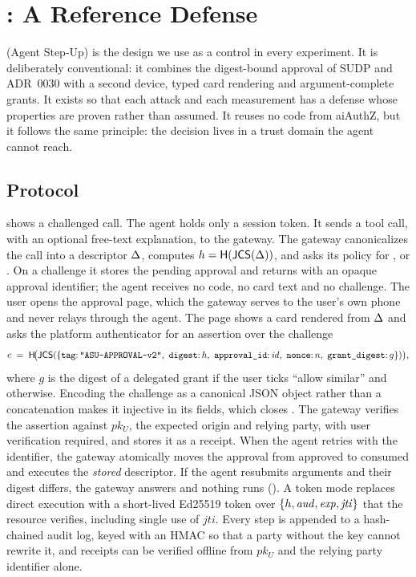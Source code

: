 \section{\sys{}: A Reference Defense}\label{sec:design}

\sys{} (Agent Step-Up) is the design we use as a control in every experiment. It is deliberately conventional:
it combines the digest-bound approval of SUDP and ADR~0030 with a second device, typed card rendering and
argument-complete grants. It exists so that each attack and each measurement has a defense whose properties are
proven rather than assumed. It reuses no code from aiAuthZ, but it follows the same principle: the decision
lives in a trust domain the agent cannot reach.

\subsection{Protocol}

 shows a challenged call. The agent holds only a session token. It sends a tool call, with an
optional free-text explanation, to the gateway. The gateway canonicalizes the call into a descriptor $\Delta$,
computes $h=\mathsf{H}(\mathsf{JCS}(\Delta))$, and asks its policy for ,  or . On a
challenge it stores the pending approval and returns  with an opaque approval identifier; the agent
receives no code, no card text and no challenge. The user opens the approval page, which the gateway serves to
the user's own phone and never relays through the agent. The page shows a card rendered from $\Delta$ and asks the
platform authenticator for an assertion over the challenge
\[
c \;=\; \Hash\!\big(\JCS(\{\texttt{tag}{:}\,\texttt{"ASU-APPROVAL-v2"},\ \texttt{digest}{:}\,\dig,\
\texttt{approval\_id}{:}\,\mathit{id},\ \texttt{nonce}{:}\,n,\ \texttt{grant\_digest}{:}\,g\})\big),
\]
where $g$ is the digest of a delegated grant if the user ticks ``allow similar'' and  otherwise.
Encoding the challenge as a canonical JSON object rather than a concatenation makes it injective in its fields,
which closes \AB{8}. The gateway verifies the assertion against $pk_U$, the expected origin and relying party,
with user verification required, and stores it as a receipt. When the agent retries with the identifier, the
gateway atomically moves the approval from approved to consumed and executes the \emph{stored} descriptor. If the
agent resubmits arguments and their digest differs, the gateway answers \code{409 effect\_mismatch} and nothing
runs (\AB{10}). A token mode replaces direct execution with a short-lived Ed25519 token over
$\{h,\mathit{aud},\mathit{exp},\mathit{jti}\}$ that the resource verifies, including single use of
$\mathit{jti}$. Every step is appended to a hash-chained audit log, keyed with an HMAC so that a party without the
key cannot rewrite it, and receipts can be verified offline from $pk_U$ and the relying party identifier alone.

